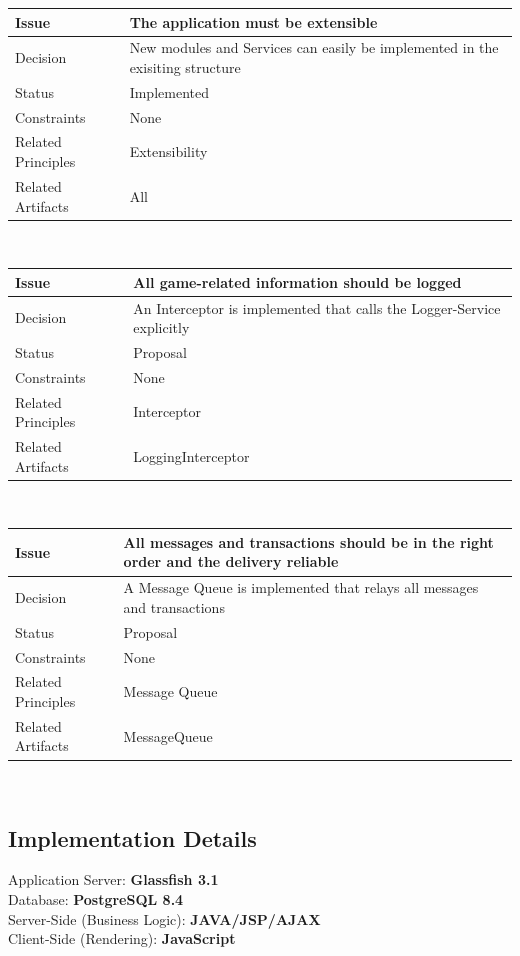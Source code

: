 \documentclass[a4paper]{article}
\begin{document}
\begin{tabular}[t]{|l|p{10cm}|}
\hline
\textbf{Issue}	&	The application must be extensible\\
\hline
Decision & New modules and Services can easily be implemented in the exisiting structure\\
\hline
Status	& Implemented\\
\hline
Constraints	&	None\\
\hline
Related Principles	&	Extensibility\\
\hline
Related Artifacts	&	All\\
\hline
\end{tabular}\\

\begin{tabular}[t]{|l|p{10cm}|}
\hline
\textbf{Issue}	&	All game-related information should be logged\\
\hline
Decision & An Interceptor is implemented that calls the Logger-Service explicitly\\
\hline
Status	& Proposal\\
\hline
Constraints	&	None\\
\hline
Related Principles	&	Interceptor\\
\hline
Related Artifacts	&	LoggingInterceptor\\
\hline
\end{tabular}\\


\begin{tabular}[t]{|l|p{10cm}|}
\hline
\textbf{Issue}	&	All messages and transactions should be in the right order and the delivery reliable\\
\hline
Decision & A Message Queue is implemented that relays all messages and transactions\\
\hline
Status	& Proposal\\
\hline
Constraints	&	None\\
\hline
Related Principles	&	Message Queue\\
\hline
Related Artifacts	&	MessageQueue\\
\hline
\end{tabular}\\

\subsection{Implementation Details}

Application Server: \textbf{Glassfish 3.1}\\
Database: \textbf{PostgreSQL 8.4}\\
Server-Side (Business Logic): \textbf{JAVA/JSP/AJAX}\\
Client-Side (Rendering): \textbf{JavaScript}\\
\end{document}
